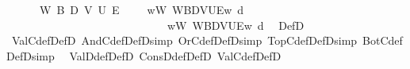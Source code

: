 \begin{isabellebody}
\ \ {\isachardoublequoteopen}{\isasymGamma}\ {\isasymTurnstile}\ {\isasymphi}\ {\isasymequiv}\ {\isasymforall}W\ B\ D\ V\ U\ E{\isachardot}{\kern0pt}\ {\isacharparenleft}{\kern0pt}{\isasymforall}{\isasymgamma}{\isachardot}{\kern0pt}\ {\isasymGamma}\ {\isasymgamma}\ {\isasymlongrightarrow}\ {\isacharparenleft}{\kern0pt}{\isasymforall}w{\isacharcolon}{\kern0pt}W{\isachardot}{\kern0pt}\ {\isasymlangle}W{\isacharcomma}{\kern0pt}B{\isacharcomma}{\kern0pt}D{\isacharcomma}{\kern0pt}V{\isacharcomma}{\kern0pt}U{\isacharcomma}{\kern0pt}E{\isasymrangle}{\isacharcomma}{\kern0pt}w\ {\isasymTurnstile}\isactrlsup d\ {\isasymgamma}{\isacharparenright}{\kern0pt}{\isacharparenright}{\kern0pt}\isanewline
\ \ \ \ \ \ \ \ \ \ \ \ \ \ \ \ \ \ \ \ \ \ \ \ \ \ \ \ {\isasymlongrightarrow}\ {\isacharparenleft}{\kern0pt}{\isasymforall}w{\isacharcolon}{\kern0pt}W{\isachardot}{\kern0pt}\ {\isasymlangle}W{\isacharcomma}{\kern0pt}B{\isacharcomma}{\kern0pt}D{\isacharcomma}{\kern0pt}V{\isacharcomma}{\kern0pt}U{\isacharcomma}{\kern0pt}E{\isasymrangle}{\isacharcomma}{\kern0pt}w\ {\isasymTurnstile}\isactrlsup d\ {\isasymphi}{\isacharparenright}{\kern0pt}{\isachardoublequoteclose}\isanewline
\isanewline
{}\isamarkupfalse%
\ DefD\isanewline
{}\isamarkupfalse%
\ ValC{\isacharunderscore}{\kern0pt}def{\isacharbrackleft}{\kern0pt}DefD{\isacharbrackright}{\kern0pt}\ AndC{\isacharunderscore}{\kern0pt}def{\isacharbrackleft}{\kern0pt}DefD{\isacharcomma}{\kern0pt}simp{\isacharbrackright}{\kern0pt}\ OrC{\isacharunderscore}{\kern0pt}def{\isacharbrackleft}{\kern0pt}DefD{\isacharcomma}{\kern0pt}simp{\isacharbrackright}{\kern0pt}\ TopC{\isacharunderscore}{\kern0pt}def{\isacharbrackleft}{\kern0pt}DefD{\isacharcomma}{\kern0pt}simp{\isacharbrackright}{\kern0pt}\ BotC{\isacharunderscore}{\kern0pt}def{\isacharbrackleft}{\kern0pt}DefD{\isacharcomma}{\kern0pt}simp{\isacharbrackright}{\kern0pt}\isanewline
\ \ ValD{\isacharunderscore}{\kern0pt}def{\isacharbrackleft}{\kern0pt}DefD{\isacharbrackright}{\kern0pt}\ ConsD{\isacharunderscore}{\kern0pt}def{\isacharbrackleft}{\kern0pt}DefD{\isacharbrackright}{\kern0pt}\ ValC{\isacharunderscore}{\kern0pt}def{\isacharbrackleft}{\kern0pt}DefD{\isacharbrackright}{\kern0pt}\isanewline
%
\isadelimtheory
\isanewline
%
\endisadelimtheory
%
\isatagtheory
{}\isamarkupfalse%
%
\endisatagtheory
{\isafoldtheory}%
%
\isadelimtheory
%
\endisadelimtheory
%
\end{isabellebody}%
\endinput

